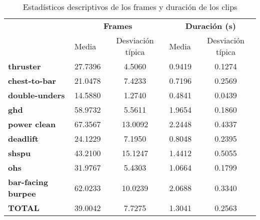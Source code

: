 \begin{table}[htbp]
\centering
\caption{Estadísticos descriptivos de los frames y duración de los clips}
\label{table_descriptive_stats}
\begin{tabular}{l|lc|lc}
\toprule
{} & \multicolumn{2}{c|}{\textbf{Frames}} & \multicolumn{2}{c}{\textbf{Duración (s)}} \\
{} &    Media & Desviación típica &        Media & Desviación típica \\
\midrule
\textbf{thruster}          &  27.7396 &            4.5060 &       0.9419 &            0.1274 \\
\textbf{chest-to-bar}      &  21.0478 &            7.4233 &       0.7196 &            0.2569 \\
\textbf{double-unders}     &  14.5880 &            1.2740 &       0.4841 &            0.0439 \\
\textbf{ghd}               &  58.9732 &            5.5611 &       1.9654 &            0.1860 \\
\textbf{power clean}       &  67.3567 &           13.0092 &       2.2448 &            0.4337 \\
\textbf{deadlift}          &  24.1229 &            7.1950 &       0.8048 &            0.2395 \\
\textbf{shspu}             &  43.2100 &           15.1247 &       1.4412 &            0.5055 \\
\textbf{ohs}               &  31.9767 &            5.4303 &       1.0664 &            0.1799 \\
\textbf{bar-facing burpee} &  62.0233 &           10.0239 &       2.0688 &            0.3340 \\
\textbf{TOTAL}             &  39.0042 &           7.7275  &       1.3041 &            0.2563 \\
\bottomrule
\end{tabular}
\end{table}
